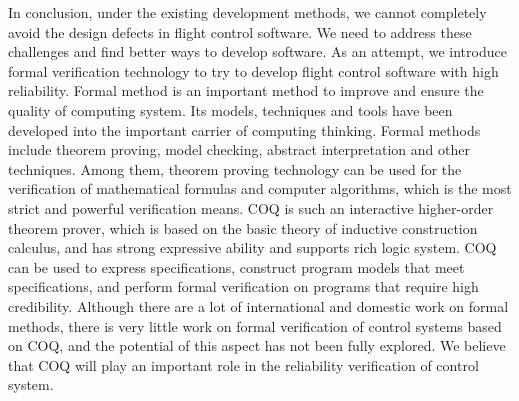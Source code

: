 \documentclass{article} %
\numberwithin{equation}{section} %
\begin{document}

In conclusion, under the existing development methods, we cannot completely avoid the design defects in flight control software.
We need to address these challenges and find better ways to develop software.
As an attempt, we introduce formal verification technology to try to develop flight control software with high reliability.
Formal method is an important method to improve and ensure the quality of computing system. 
Its models, techniques and tools have been developed into the important carrier of computing thinking.
Formal methods include theorem proving, model checking, abstract interpretation and other techniques.
Among them, theorem proving technology can be used for the verification of mathematical formulas and computer algorithms, which is the most strict and powerful verification means.
COQ is such an interactive higher-order theorem prover, which is based on the basic theory of inductive construction calculus, and has strong expressive ability and supports rich logic system.
COQ can be used to express specifications, construct program models that meet specifications, and perform formal verification on programs that require high credibility.
Although there are a lot of international and domestic work on formal methods, there is very little work on formal verification of control systems based on COQ, and the potential of this aspect has not been fully explored.
We believe that COQ will play an important role in the reliability verification of control system.
\end{document}
